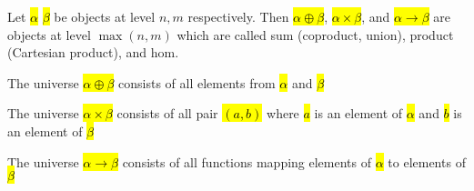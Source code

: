 Let \hl{$\alpha$} \hl{$\beta$} be objects at level $n, m$ respectively. Then \hl{$\alpha \oplus \beta$}, \hl{$\alpha \times \beta$}, and \hl{$\alpha \to \beta$} are objects at level $\max(n, m)$ which are called sum (coproduct, union), product (Cartesian product), and hom.

The universe \hl{$\alpha \oplus \beta$} consists of all elements from \hl{$\alpha$} and \hl{$\beta$}

The universe \hl{$\alpha \times \beta$} consists of all pair \hl{$(a, b)$} where \hl{$a$} is an element of \hl{$\alpha$} and \hl{$b$} is an element of \hl{$\beta$}

The universe \hl{$\alpha \to \beta$} consists of all functions mapping elements of \hl{$\alpha$} to elements of \hl{$\beta$}



